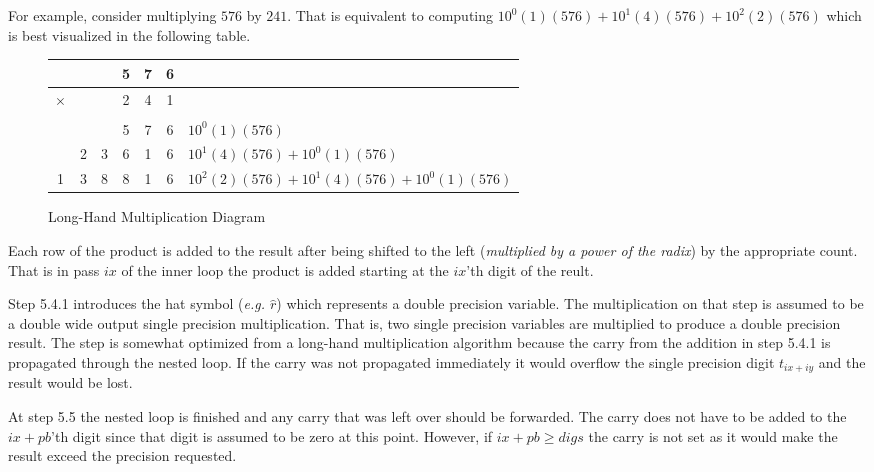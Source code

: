 \documentclass[b5paper]{book}
\begin{document}
For example, consider multiplying $576$ by $241$.  That is equivalent to computing $10^0(1)(576) + 10^1(4)(576) + 10^2(2)(576)$ which is best
visualized in the following table.

\begin{figure}[here]
\begin{center}
\begin{tabular}{|c|c|c|c|c|c|l|}
\hline   &&          & 5 & 7 & 6 & \\
\hline   $\times$&&  & 2 & 4 & 1 & \\
\hline &&&&&&\\
  &&          & 5 & 7 & 6 & $10^0(1)(576)$ \\
  &2 &   3    & 6 & 1 & 6 & $10^1(4)(576) + 10^0(1)(576)$ \\
  1 & 3 & 8 & 8 & 1 & 6 &   $10^2(2)(576) + 10^1(4)(576) + 10^0(1)(576)$ \\
\hline  
\end{tabular}
\end{center}
\caption{Long-Hand Multiplication Diagram}
\end{figure}

Each row of the product is added to the result after being shifted to the left (\textit{multiplied by a power of the radix}) by the appropriate 
count.  That is in pass $ix$ of the inner loop the product is added starting at the $ix$'th digit of the reult.

Step 5.4.1 introduces the hat symbol (\textit{e.g. $\hat r$}) which represents a double precision variable.  The multiplication on that step
is assumed to be a double wide output single precision multiplication.  That is, two single precision variables are multiplied to produce a
double precision result.  The step is somewhat optimized from a long-hand multiplication algorithm because the carry from the addition in step
5.4.1 is propagated through the nested loop.  If the carry was not propagated immediately it would overflow the single precision digit 
$t_{ix+iy}$ and the result would be lost.  

At step 5.5 the nested loop is finished and any carry that was left over should be forwarded.  The carry does not have to be added to the $ix+pb$'th
digit since that digit is assumed to be zero at this point.  However, if $ix + pb \ge digs$ the carry is not set as it would make the result
exceed the precision requested.
\end{document}
